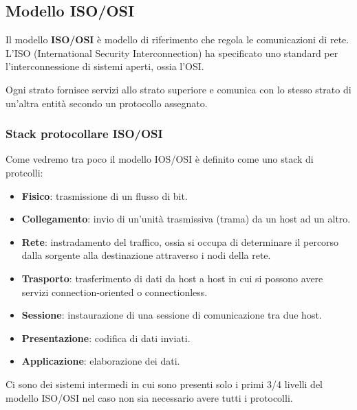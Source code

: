 \subsection{Modello ISO/OSI}
Il modello \textbf{ISO/OSI} è modello di riferimento che regola le comunicazioni di rete. L'ISO
(International Security Interconnection) ha specificato uno standard per l'interconnessione di
sistemi aperti, ossia l'OSI.

Ogni strato fornisce servizi allo strato superiore e comunica con lo stesso strato di un'altra 
entità secondo un protocollo assegnato.

\subsubsection{Stack protocollare ISO/OSI}
Come vedremo tra poco il modello IOS/OSI è definito come uno stack di protcolli:
\begin{itemize}
	\item \textbf{Fisico}: trasmissione di un flusso di bit.
	\item \textbf{Collegamento}: invio di un'unità trasmissiva (trama) da un host ad un altro.
	\item \textbf{Rete}: instradamento del traffico, ossia si occupa di determinare il percorso 
		dalla sorgente alla destinazione attraverso i nodi della rete.
	\item \textbf{Trasporto}: trasferimento di dati da host a host in cui si possono avere servizi
		connection-oriented o connectionless.
	\item \textbf{Sessione}: instaurazione di una sessione di comunicazione tra due host.
	\item \textbf{Presentazione}: codifica di dati inviati.
	\item \textbf{Applicazione}: elaborazione dei dati.
\end{itemize}
Ci sono dei sistemi intermedi in cui sono presenti solo i primi 3/4 livelli del modello ISO/OSI
nel caso non sia necessario avere tutti i protocolli.
